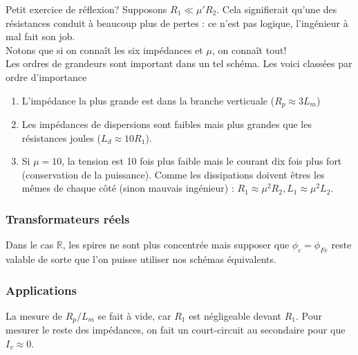 		
		Petit exercice de réflexion? Supposons $R_1\ll \mu'R_2$. Cela signifierait 
		qu'une des résistances conduit à beaucoup plus de pertes : ce n'est pas 
		logique, l'ingénieur à mal fait son job.\\
		Notons que si on connaît les six impédances et $\mu$, on connaît tout!\\
		
		Les ordres de grandeurs sont important dans un tel schéma. Les voici 
		classées par ordre d'importance 
		\begin{enumerate}
		\item L'impédance la plus grande est dans la branche verticuale ($R_p \approx 
		3 L_m$)
		\item Les impédances de dispersions sont faibles mais plus grandes que 
		les résistances joules ($L_d \approx 10 R_1$).
		\item Si $\mu = 10$, la tension est 10 fois plus faible mais le courant 
		dix fois plus fort (conservation de la puissance). Comme les dissipations 
		doivent êtres les mêmes de chaque côté (sinon mauvais ingénieur) : $R_1 
		\approx \mu^2R_2, L_1\approx \mu^2L_2$.
		\end{enumerate}
		
	
		\subsubsection{Transformateurs réels}
		Dans le cas $\mathbb{R}$, les spires ne sont plus concentrée mais 
		supposer que $\phi_c = \phi_{Fe}$ reste valable de sorte que l'on 
		puisse utiliser nos schémas équivalents.	
	
		\subsubsection{Applications}
		La mesure de $R_p/L_m$ se fait à vide, car $R_1$ est négligeable devant 
		$R_1$. Pour mesurer le reste des impédances, on fait un court-circuit 
		au secondaire pour que $I_v\approx0$.
		
		
	\setcounter{subsection}{4}	
